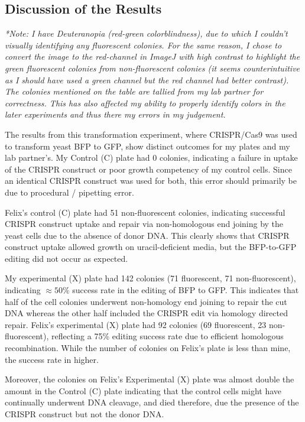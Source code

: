 \documentclass[12pt,a4paper]{article}
\begin{document}
\subsection{Discussion of the Results}
\textit{*Note: I have Deuteranopia (red-green colorblindness), due to which I couldn't visually identifying any fluorescent colonies. For the same reason, I chose to convert the image to the red-channel in ImageJ with high contrast to highlight the green fluorescent colonies from non-fluorescent colonies (it seems counterintuitive as I should have used a green channel but the red channel had better contrast). The colonies mentioned on the table are tallied from my lab partner for correctness. This has also affected my ability to properly identify colors in the later experiments and thus there my errors in my judgement. }

The results from this transformation experiment, where CRISPR/Cas9 was used to
transform yeast BFP to GFP, show distinct outcomes for my plates and my lab
partner's. My Control (C) plate had 0 colonies, indicating a failure in uptake
of the CRISPR construct or poor growth competency of my control cells. Since an
identical CRISPR construct was used for both, this error should primarily be
due to procedural / pipetting error.

Felix's control (C) plate had 51 non-fluorescent colonies, indicating
successful CRISPR construct uptake and repair via non-homologous end joining by
the yeast cells due to the absence of donor DNA. This clearly shows that CRISPR
construct uptake allowed growth on uracil-deficient media, but the BFP-to-GFP
editing did not occur as expected.

My experimental (X) plate had 142 colonies (71 fluorescent, 71
non-fluorescent), indicating $\approx 50\%$ success rate in the editing of BFP
to GFP. This indicates that half of the cell colonies underwent non-homology
end joining to repair the cut DNA whereas the other half included the CRISPR
edit via homology directed repair. Felix's experimental (X) plate had 92
colonies (69 fluorescent, 23 non-fluorescent), reflecting a 75\% editing
success rate due to efficient homologous recombination. While the number of
colonies on Felix's plate is less than mine, the success rate in higher.

Moreover, the colonies on Felix's Experimental (X) plate was almost double the
amount in the Control (C) plate indicating that the control cells might have
continually underwent DNA cleavage, and died therefore, due the presence of the
CRISPR construct but not the donor DNA.
\end{document}
